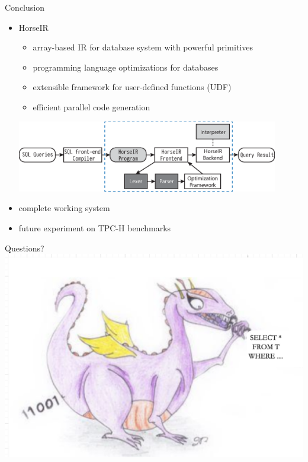 \documentclass{beamer}
\begin{document}
\begin{frame}{Conclusion}
\begin{itemize}
    \item HorseIR
          \begin{itemize}
          \item array-based IR for database system with powerful primitives
          \item programming language optimizations for databases
          \item extensible framework for user-defined functions (UDF)
          \item efficient parallel code generation
          \end{itemize}
          \includegraphics[width=0.9\textwidth]{horse-finished}
    \item complete working system
    \item future experiment on TPC-H benchmarks
\end{itemize}
\end{frame}

\begin{frame}{Questions?}
\includegraphics[width=\textwidth]{logo-dragon}
\end{frame}
\end{document}
